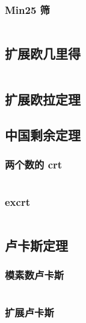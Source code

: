 \documentclass[a4paper, twoside]{article}
\begin{document}
\begin{multicols}{2}
				\subsubsection{Min25 筛}
					\inputminted{cpp}{../src-midori/number/min25.cpp}

			\subsection{扩展欧几里得}
				\inputminted{cpp}{../src-midori/number/exgcd.cpp}
			
			\subsection{扩展欧拉定理}
				

			\subsection{中国剩余定理}
				\subsubsection{两个数的 crt}
					\inputminted{cpp}{../src-midori/number/两个数的crt.cpp}
				\subsubsection{excrt}
					\inputminted{cpp}{../src-midori/number/excrt.cpp}
			
			\subsection{卢卡斯定理}
				\subsubsection{模素数卢卡斯}
					\inputminted{cpp}{../src-midori/number/lucas.cpp}
				\subsubsection{扩展卢卡斯}
					\inputminted{cpp}{../src-midori/number/exlucas.cpp}
			

\end{multicols}
\end{document}
